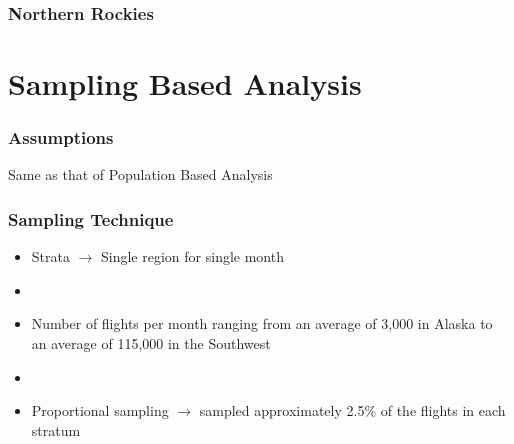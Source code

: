 \documentclass{beamer}
\begin{document}
\begin{frame}
\frametitle{Northern Rockies}
\begin{center}
\end{center}
\end{frame}









\section{Sampling Based Analysis}
\begin{frame}
\frametitle{Assumptions}
\begin{center}
Same as that of Population Based Analysis 
\end{center}
\end{frame}




\begin{frame}
\frametitle{Sampling Technique}
\begin{itemize}
\item Strata $\rightarrow$ Single region for single month

\item[]

\item Number of flights per month ranging from an average of 3,000 in Alaska to an average of 115,000 in the Southwest

\item[]

\item Proportional sampling $\rightarrow$ sampled approximately 2.5\% of the flights in each
stratum
\end{itemize} 
\end{frame}
\end{document}
